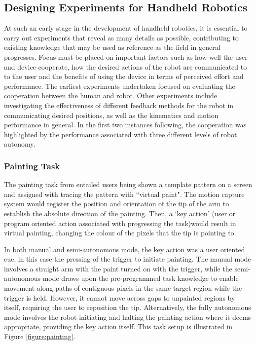\documentclass[11pt]{article}
\begin{document}
\subsection{Designing Experiments for Handheld Robotics} \label{designingexperiments}
At such an early stage in the development of handheld robotics, it is essential to carry out experiments that reveal as many details as possible, contributing to existing knowledge that may be used as reference as the field in general progresses. Focus must be placed on important factors such as how well the user and device cooperate, how the desired actions of the robot are communicated to to the user and the benefits of using the device in terms of perceived effort and performance. The earliest experiments undertaken focused on evaluating the cooperation between the human and robot. Other experiments include investigating the effectiveness of different feedback methods for the robot in communicating desired positions, as well as the kinematics and motion performance in general. In the first two instances following, the cooperation was highlighted by the performance associated with three different levels of robot autonomy.

\subsubsection{Painting Task}
The painting task from \cite{GreggSmithDesign} entailed users being shown a template pattern on a screen and assigned with tracing the pattern with ``virtual paint". The motion capture system would register the position and orientation of the tip of the arm to establish the absolute direction of the painting. Then, a `key action' (user or program oriented action associated with progressing the task)would result in virtual painting, changing the colour of the pixels that the tip is pointing to. 

In both manual and semi-autonomous mode, the key action was a user oriented cue, in this case the pressing of the trigger to initiate painting. The manual mode involves a straight arm with the paint turned on with the trigger, while the semi-autonomous mode draws upon the pre-programmed task knowledge to enable movement along paths of contiguous pixels in the same target region while the trigger is held. However, it cannot move across gaps to unpainted regions by itself, requiring the user to reposition the tip. Alternatively, the fully autonomous mode involves the robot initiating and halting the painting action where it deems appropriate, providing the key action itself. This task setup is illustrated in Figure \ref{figure:painting}.
\end{document}
